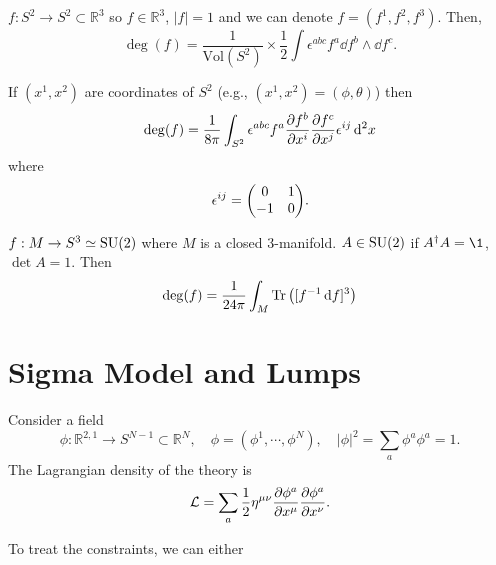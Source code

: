\documentclass[a4paper,11pt]{article}
\begin{document}
    \begin{ex}
        $f: S^2 \to S^2 \subset \mathbb{R}^3$ so $f \in \mathbb{R}^3$, $|f|=1$ and we can denote $f=(f^1,f^2,f^3)$. Then, 
        \begin{equation}
            \deg(f) = \frac{1}{\text{Vol}(S^2)} \times \frac{1}{2} \int \epsilon^{abc} f^a \dd{f^b} \wedge \dd{f^c}. \label{eq:S2-S2}
        \end{equation}

        If $(x^1,x^2)$ are coordinates of $S^2$ (e.g., $(x^1,x^2) = (\phi,\theta)$) then 
        \begin{equation}
            \deg(f) = \frac{1}{8 \pi} \int_{S^2} \epsilon^{abc} f^a \pdv{f^b}{x^i} \pdv{f^c}{x^j} \epsilon^{ij} \dd[2]{x}
        \end{equation}
        where 
        \begin{equation}
            \epsilon^{ij} = \mqty(0 & 1\\-1 & 0).
        \end{equation}
    \end{ex}
    \begin{ex}
        $f: M \to S^3 \simeq \operatorname{SU}(2)$ where $M$ is a closed 3-manifold. $A \in \operatorname{SU}(2)$ if $A^{\dagger} A = \1$, $\det A = 1$. Then 
        \begin{equation}
            \deg(f) = \frac{1}{24 \pi} \int_M \Tr\left( [f^{-1} \dd{f}]^3 \right) \label{eq:su-2}
        \end{equation}
    \end{ex}
    \newpage 
    \section{Sigma Model and Lumps}
    Consider a field 
    \begin{equation}
        \phi : \mathbb{R}^{2,1} \to S^{N-1} \subset \mathbb{R}^N, \quad \phi = (\phi^1,\cdots,\phi^N), \quad |\phi|^2 = \sum_a \phi^a \phi^a = 1.
    \end{equation}
    The Lagrangian density of the theory is 
    \begin{equation}
        \mathcal{L} = \sum_a \frac{1}{2} \eta^{\mu \nu} \pdv{\phi^a}{x^\mu} \pdv{\phi^a}{x^\nu}.
    \end{equation}

    To treat the constraints, we can either 
    
\end{document}
